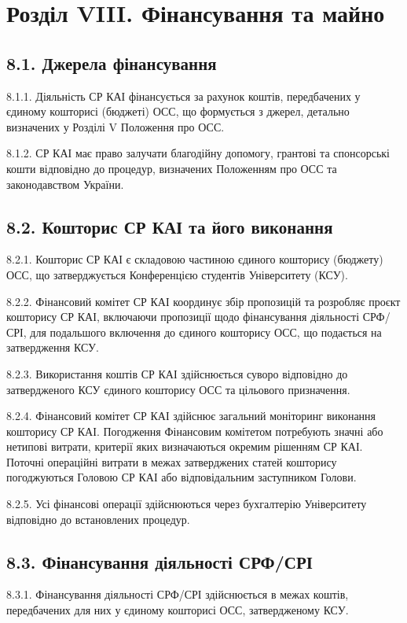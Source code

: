 \section*{Розділ VIII. Фінансування та майно}

\subsection*{8.1. Джерела фінансування}
    8.1.1. Діяльність СР КАІ фінансується за рахунок коштів, передбачених у єдиному кошторисі (бюджеті) ОСС, що формується з джерел, детально визначених у Розділі V Положення про ОСС.

    8.1.2. СР КАІ має право залучати благодійну допомогу, грантові та спонсорські кошти відповідно до процедур, визначених Положенням про ОСС та законодавством України.

\subsection*{8.2. Кошторис СР КАІ та його виконання}
    8.2.1. Кошторис СР КАІ є складовою частиною єдиного кошторису (бюджету) ОСС, що затверджується Конференцією студентів Університету (КСУ).

    8.2.2. Фінансовий комітет СР КАІ координує збір пропозицій та розробляє проєкт кошторису СР КАІ, включаючи пропозиції щодо фінансування діяльності СРФ/СРІ, для подальшого включення до єдиного кошторису ОСС, що подається на затвердження КСУ.

    8.2.3. Використання коштів СР КАІ здійснюється суворо відповідно до затвердженого КСУ єдиного кошторису ОСС та цільового призначення.

    8.2.4. Фінансовий комітет СР КАІ здійснює загальний моніторинг виконання кошторису СР КАІ. Погодження Фінансовим комітетом потребують значні або нетипові витрати, критерії яких визначаються окремим рішенням СР КАІ. Поточні операційні витрати в межах затверджених статей кошторису погоджуються Головою СР КАІ або відповідальним заступником Голови.

    8.2.5. Усі фінансові операції здійснюються через бухгалтерію Університету відповідно до встановлених процедур.

\subsection*{8.3. Фінансування діяльності СРФ/СРІ}
    8.3.1. Фінансування діяльності СРФ/СРІ здійснюється в межах коштів, передбачених для них у єдиному кошторисі ОСС, затвердженому КСУ.

